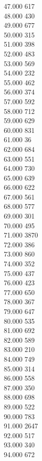 { 47.000	617 \\
 48.000	430 \\
 49.000	677 \\
 50.000	315 \\
 51.000	398 \\
 52.000	483 \\
 53.000	569 \\
 54.000	232 \\
 55.000	462 \\
 56.000	374 \\
 57.000	592 \\
 58.000	712 \\
 59.000	629 \\
 60.000	831 \\
 61.000	36 \\
 62.000	684 \\
 63.000	551 \\
 64.000	730 \\
 65.000	639 \\
 66.000	622 \\
 67.000	561 \\
 68.000	577 \\
 69.000	301 \\
 70.000	495 \\
 71.000	3870 \\
 72.000	386 \\
 73.000	860 \\
 74.000	352 \\
 75.000	437 \\
 76.000	423 \\
 77.000	650 \\
 78.000	367 \\
 79.000	647 \\
 80.000	535 \\
 81.000	692 \\
 82.000	589 \\
 83.000	210 \\
 84.000	749 \\
 85.000	314 \\
 86.000	558 \\
 87.000	350 \\
 88.000	698 \\
 89.000	522 \\
 90.000	783 \\
 91.000	2647 \\
 92.000	517 \\
 93.000	340 \\
 94.000	672 \\
}
